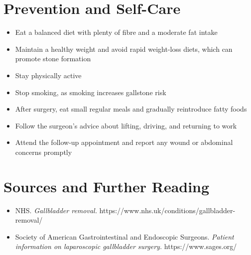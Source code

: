 \section*{Prevention and Self-Care}
\begin{itemize}
    \item Eat a balanced diet with plenty of fibre and a moderate fat intake
    \item Maintain a healthy weight and avoid rapid weight-loss diets, which can promote stone formation
    \item Stay physically active
    \item Stop smoking, as smoking increases gallstone risk
    \item After surgery, eat small regular meals and gradually reintroduce fatty foods
    \item Follow the surgeon's advice about lifting, driving, and returning to work
    \item Attend the follow-up appointment and report any wound or abdominal concerns promptly
\end{itemize}

\section*{Sources and Further Reading}
\begin{itemize}
    \item NHS. \textit{Gallbladder removal.} https://www.nhs.uk/conditions/gallbladder-removal/
    \item Society of American Gastrointestinal and Endoscopic Surgeons. \textit{Patient information on laparoscopic gallbladder surgery.} https://www.sages.org/
\end{itemize}
